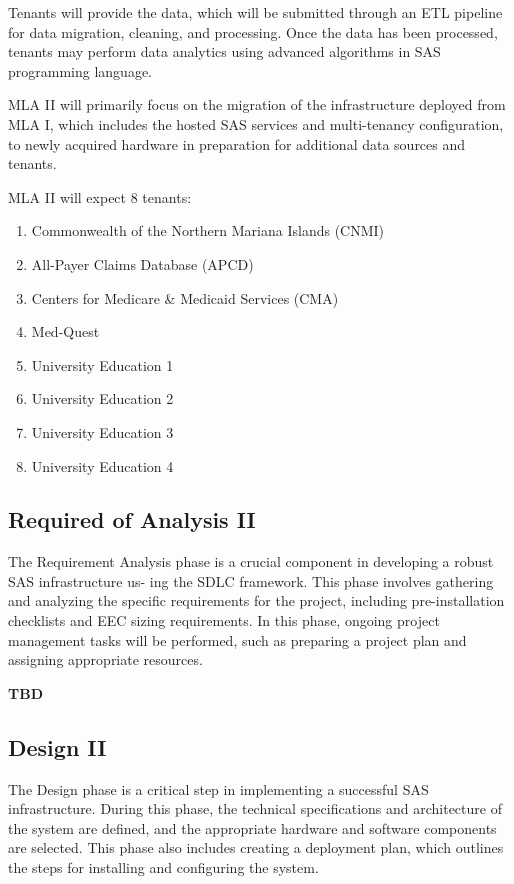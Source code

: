 Tenants will provide the data, which will be submitted through an ETL pipeline for data migration, cleaning, and processing. Once the data has been processed, tenants may perform data analytics using advanced algorithms in SAS programming language.

MLA II will primarily focus on the migration of the infrastructure deployed from MLA I, which includes the hosted SAS services and multi-tenancy configuration, to newly acquired hardware in preparation for additional data sources and tenants.

MLA II will expect 8 tenants:

\begin{enumerate}
    \item Commonwealth of the Northern Mariana Islands (CNMI)
    \item All-Payer Claims Database (APCD)
    \item Centers for Medicare \& Medicaid Services (CMA)
    \item Med-Quest
    \item University Education 1
    \item University Education 2
    \item University Education 3
    \item University Education 4
\end{enumerate}

\subsection{Required of Analysis II}
The Requirement Analysis phase is a crucial component in developing a robust SAS infrastructure us-
ing the SDLC framework. This phase involves gathering and analyzing the specific requirements for
the project, including pre-installation checklists and EEC sizing requirements. In this phase, ongoing
project management tasks will be performed, such as preparing a project plan and assigning appropriate
resources.

\textbf{TBD}

\subsection{Design II}
The Design phase is a critical step in implementing a successful SAS infrastructure. During this phase,
the technical specifications and architecture of the system are defined, and the appropriate hardware and
software components are selected. This phase also includes creating a deployment plan, which outlines
the steps for installing and configuring the system.

